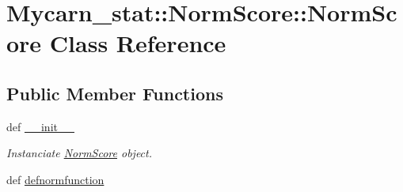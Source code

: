 \hypertarget{classMycarn__stat_1_1NormScore_1_1NormScore}{
\section{\-Mycarn\-\_\-stat\-:\-:\-Norm\-Score\-:\-:\-Norm\-Score \-Class \-Reference}
\label{classMycarn__stat_1_1NormScore_1_1NormScore}
}
\subsection*{\-Public \-Member \-Functions}
\begin{DoxyCompactItemize}
\item 
def \hyperlink{classMycarn__stat_1_1NormScore_1_1NormScore_a356e9e0570cb6260fc07e060a2b89473}{\-\_\-\-\_\-init\-\_\-\-\_\-}
\begin{DoxyCompactList}\small\item\em \-Instanciate \hyperlink{classMycarn__stat_1_1NormScore_1_1NormScore}{\-Norm\-Score} object. \end{DoxyCompactList}\item 
\hypertarget{classMycarn__stat_1_1NormScore_1_1NormScore_adecaa88f3492f37db19569dfe587518d}{
def \hyperlink{classMycarn__stat_1_1NormScore_1_1NormScore_adecaa88f3492f37db19569dfe587518d}{defnormfunction}}
\label{classMycarn__stat_1_1NormScore_1_1NormScore_adecaa88f3492f37db19569dfe587518d}


\end{DoxyCompactItemize}
